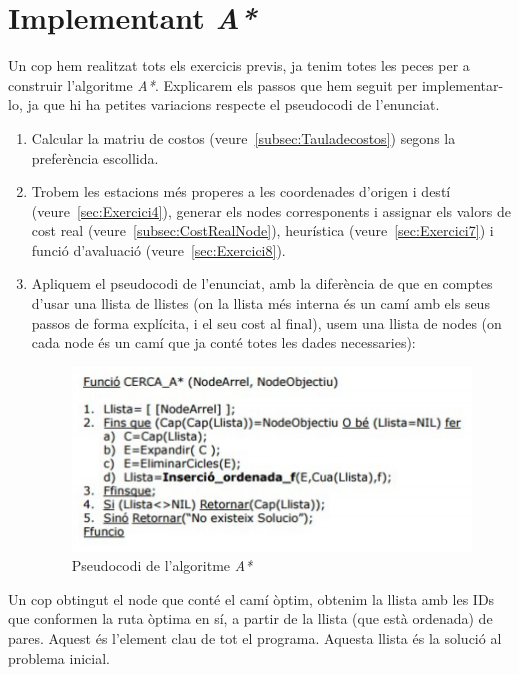 \documentclass[a4paper,12pt,hidelinks]{article}
\begin{document}
    \pagebreak
        
    \part{Implementant \textit{A*}}
    \label{part:astar}
    
        Un cop hem realitzat tots els exercicis previs, ja tenim totes les peces per a construir l’algoritme \textit{A*}. Explicarem els passos que hem seguit per implementar-lo, ja que hi ha petites variacions respecte el pseudocodi de l’enunciat.
        
        \begin{enumerate}
            \item Calcular la matriu de costos (veure~\ref{subsec:Tauladecostos}) segons la preferència escollida.
            \item Trobem les estacions més properes a les coordenades d'origen i destí (veure~\ref{sec:Exercici4}), generar els nodes corresponents i assignar els valors de cost real (veure~\ref{subsec:CostRealNode}), heurística (veure~\ref{sec:Exercici7}) i funció d’avaluació (veure~\ref{sec:Exercici8}).
            \item Apliquem el pseudocodi de l'enunciat, amb la diferència de que en comptes d’usar una llista de llistes (on la llista més interna és un camí amb els seus passos de forma explícita, i el seu cost al final), usem una llista de nodes (on cada node és un camí que ja conté totes les dades necessaries):
            \begin{figure}[h]
                \centering    
                \includegraphics{pseudo.png}
                \caption{Pseudocodi de l'algoritme \textit{A*}}
            \end{figure}
        \end{enumerate}
    
        Un cop obtingut el node que conté el camí òptim, obtenim la llista amb les IDs que conformen la ruta òptima en sí, a partir de la llista (que està ordenada) de pares. Aquest és l’element clau de tot el programa. Aquesta llista és la solució al problema inicial.
\end{document}
